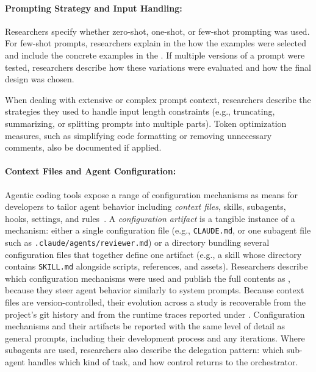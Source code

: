 \paragraph{Prompting Strategy and Input Handling:}
Researchers \must specify whether zero-shot, one-shot, or few-shot prompting was used.
For few-shot prompts, researchers \must explain in the \paper how the examples were selected and \should include the concrete examples in the \supplementarymaterial.
If multiple versions of a prompt were tested, researchers \should describe how these variations were evaluated and how the final design was chosen.

When dealing with extensive or complex prompt context, researchers \should describe the strategies they used to handle input length constraints (e.g., truncating, summarizing, or splitting prompts into multiple parts).
Token optimization measures, such as simplifying code formatting or removing unnecessary comments, \should also be documented if applied.

\paragraph{Context Files and Agent Configuration:}
Agentic coding tools expose a range of configuration mechanisms as means for developers to tailor agent behavior including \emph{context files}, skills, subagents, hooks, settings, and rules~\cite{galster2026configuring}.
A \emph{configuration artifact} is a tangible instance of a mechanism: either a single configuration file (e.g., \texttt{CLAUDE.md}, or one subagent file such as \texttt{.claude/agents/reviewer.md}) or a directory bundling several configuration files that together define one artifact (e.g., a skill whose directory contains \texttt{SKILL.md} alongside scripts, references, and assets).
Researchers \must describe which configuration mechanisms were used and \should publish the full contents as \supplementarymaterial, because they steer agent behavior similarly to system prompts.
Because context files are version-controlled, their evolution across a study is recoverable from the project's git history and from the runtime traces reported under \traces.
Configuration mechanisms and their artifacts \must be reported with the same level of detail as general prompts, including their development process and any iterations.
Where subagents are used, researchers \should also describe the delegation pattern: which sub-agent handles which kind of task, and how control returns to the orchestrator.

